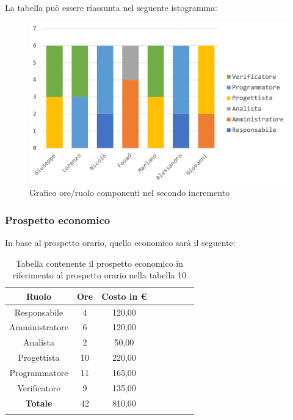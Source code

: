 		La tabella può essere riassunta nel seguente istogramma:
		\begin{figure}[H]
			\centering
			\includegraphics[width=0.8\linewidth]{./images/preventivo/incremento2-1.png}
			\caption{Grafico ore/ruolo componenti nel secondo incremento}
			\label{fig:grafico suddivione ruoli incremento II}
		\end{figure}
		
		\subsubsection{Prospetto economico}
		In base al prospetto orario, quello economico sarà il seguente: 
		
		\begin{longtable}{|c|c|c|c|c|c|c|c|}
			\hline
			\rowcolor{lighter-grayer}
			\textbf{Ruolo} & \textbf{Ore} & \textbf{Costo in € } \\
			\hline
			\endfirsthead
			
			\hline
			Responsabile 	    & 4 & 120,00\\
			\hline 
			\hline
			Amministratore	   & 6 & 120,00\\
			\hline
			\hline
			Analista 				& 2 & 50,00\\
			\hline
			\hline
			Progettista 		   & 10 & 220,00\\
			\hline
			\hline
			Programmatore 	  & 11 & 165,00\\
			\hline
			\hline
			Verificatore 		   & 9 & 135,00\\
			\hline
			\textbf{Totale} 	 & 42 & 810,00\\
			\hline
			\caption{Tabella contenente il prospetto economico in riferimento al prospetto orario nella tabella 10}
		\end{longtable}
		\pagebreak
		
